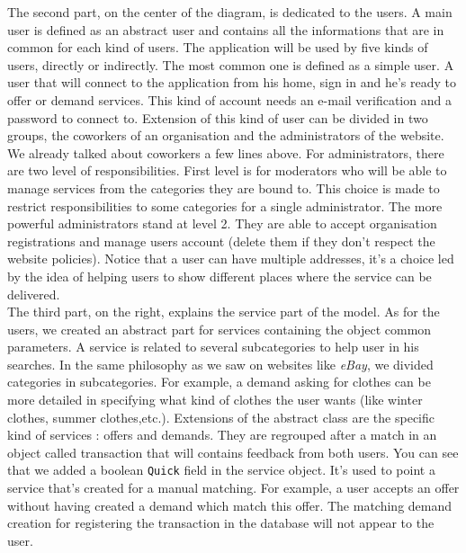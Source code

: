 The second part, on the center of the diagram, is dedicated to the users. A main user is defined as an abstract user and contains all the informations that are in common for each kind of users. The application will be used by five kinds of users, directly or indirectly. The most common one is defined as a simple user. A user that will connect to the application from his home, sign in and he's ready to offer or demand services. This kind of account needs an e-mail verification and a password to connect to. Extension of this kind of user can be divided in two groups, the coworkers of an organisation and the administrators of the website. We already talked about coworkers a few lines above. For administrators, there are two level of responsibilities. First level is for moderators who will be able to manage services from the categories they are bound to. This choice is made to restrict responsibilities to some categories for a single administrator. The more powerful administrators stand at level 2. They are able to accept organisation registrations and manage users account (delete them if they don't respect the website policies). Notice that a user can have multiple addresses, it's a choice led by the idea of helping users to show different places where the service can be delivered. \\

The third part, on the right, explains the service part of the model. As for the users, we created an abstract part for services containing the object common parameters. A service is related to several subcategories to help user in his searches. In the same philosophy as we saw on websites like \textit{eBay}, we divided categories in subcategories. For example, a demand asking for clothes can be more detailed in specifying what kind of clothes the user wants (like winter clothes, summer clothes,etc.). Extensions of the abstract class are the specific kind of services : offers and demands. They are regrouped after a match in an object called transaction that will contains feedback from both users. You can see that we added a boolean \texttt{Quick} field in the service object. It's used to point a service that's created for a manual matching. For example, a user accepts an offer without having created a demand which match this offer. The  matching demand creation for registering the transaction in the database will not appear to the user.\\


